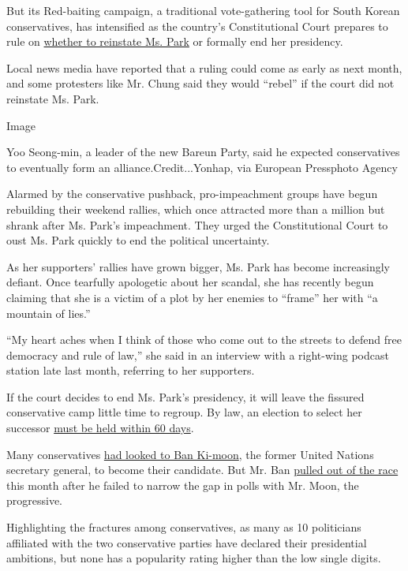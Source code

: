But its Red-baiting campaign, a traditional vote-gathering tool for
South Korean conservatives, has intensified as the country's
Constitutional Court prepares to rule on
\href{https://www.nytimes3xbfgragh.onion/2017/01/03/world/asia/south-korea-president-impeachment-trial.html}{whether
to reinstate Ms. Park} or formally end her presidency.

Local news media have reported that a ruling could come as early as next
month, and some protesters like Mr. Chung said they would ``rebel'' if
the court did not reinstate Ms. Park.

Image

Yoo Seong-min, a leader of the new Bareun Party, said he expected
conservatives to eventually form an alliance.Credit...Yonhap, via
European Pressphoto Agency

Alarmed by the conservative pushback, pro-impeachment groups have begun
rebuilding their weekend rallies, which once attracted more than a
million but shrank after Ms. Park's impeachment. They urged the
Constitutional Court to oust Ms. Park quickly to end the political
uncertainty.

As her supporters' rallies have grown bigger, Ms. Park has become
increasingly defiant. Once tearfully apologetic about her scandal, she
has recently begun claiming that she is a victim of a plot by her
enemies to ``frame'' her with ``a mountain of lies.''

``My heart aches when I think of those who come out to the streets to
defend free democracy and rule of law,'' she said in an interview with a
right-wing podcast station late last month, referring to her supporters.

If the court decides to end Ms. Park's presidency, it will leave the
fissured conservative camp little time to regroup. By law, an election
to select her successor
\href{https://www.nytimes3xbfgragh.onion/2016/11/27/world/asia/impeaching-south-korea-president.html?_r=0}{must
be held within 60 days}.

Many conservatives
\href{https://www.nytimes3xbfgragh.onion/2017/01/25/world/asia/ban-ki-moon-south-korea-president.html}{had
looked to Ban Ki-moon}, the former United Nations secretary general, to
become their candidate. But Mr. Ban
\href{https://www.nytimes3xbfgragh.onion/2017/02/01/world/asia/ban-ki-moon-president-south-korea.html}{pulled
out of the race} this month after he failed to narrow the gap in polls
with Mr. Moon, the progressive.

Highlighting the fractures among conservatives, as many as 10
politicians affiliated with the two conservative parties have declared
their presidential ambitions, but none has a popularity rating higher
than the low single digits.

